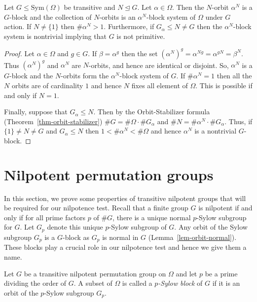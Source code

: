 \documentclass[prodmod,acmtalg]{acmsmall}
\newcommand{\Sym}[1]{{\ensuremath{\mathrm{Sym}\left(#1\right)}}}
\begin{document}
\begin{lemma}\label{lem-orbit-normal}
  Let $G\leq\Sym{\Omega}$ be transitive and $N\unlhd G$. Let
  $\alpha\in\Omega$. Then the $N$-orbit $\alpha^N$ is a $G$-block and
  the collection of $N$-orbits is an $\alpha^N$-block system of
  $\Omega$ under $G$ action. If $N\neq\{ 1 \}$ then $\# \alpha^N>1$.
  Furthermore, if $G_\alpha\leq N\neq G$ then the $\alpha^N$-block
  system is nontrivial implying that $G$ is not primitive.
\end{lemma}
\begin{proof}
  Let $\alpha\in\Omega$ and $g \in G$. If $\beta = \alpha^g$ then the
  set $(\alpha^N)^g = \alpha^{Ng} = \alpha^{gN} = \beta^N$. Thus
  $(\alpha^N)^g$ and $\alpha^N$ are $N$-orbits, and hence are
  identical or disjoint.  So, $\alpha^N$ is a $G$-block and the
  $N$-orbits form the $\alpha^N$-block system of $G$.  If $\# \alpha^N
  = 1$ then all the $N$ orbits are of cardinality $1$ and hence $N$
  fixes all element of $\Omega$. This is possible if and only if $N =
  1$.

  Finally, suppose that $G_\alpha \leq N$. Then by the
  Orbit-Stabilizer formula (Theorem~\ref{thm-orbit-stabilizer}) $\# G
  =\#\Omega\cdot\# G_\alpha$ and $\# N=\#\alpha^N\cdot\# G_\alpha$.
  Thus, if $\{1\}\neq N\neq G$ and $G_\alpha \leq N$ then $1 < \#
  \alpha^N < \# \Omega$ and hence $\alpha^N$ is a nontrivial
  $G$-block.
\end{proof}

\section{Nilpotent permutation groups}\label{sec-nilpotent-perm-group}

In this section, we prove some properties of transitive nilpotent
groups that will be required for our nilpotence test. Recall that a
finite group $G$ is nilpotent if and only if for all prime factors $p$
of $\# G$, there is a unique normal $p$-Sylow subgroup for $G$. Let
$G_p$ denote this unique $p$-Sylow subgroup of $G$. Any orbit of the
Sylow subgroup $G_p$ is a $G$-block as $G_p$ is normal in $G$
(Lemma~\ref{lem-orbit-normal}). These blocks play a crucial role in
our nilpotence test and hence we give them a name.

\begin{definition}\label{def-sylow-block}
  Let $G$ be a transitive nilpotent permutation group on $\Omega$ and
  let $p$ be a prime dividing the order of $G$.  A subset of $\Omega$
  is called a \emph{$p$-Sylow block} of $G$ if it is an orbit of the
  $p$-Sylow subgroup $G_p$.
\end{definition}
\end{document}
